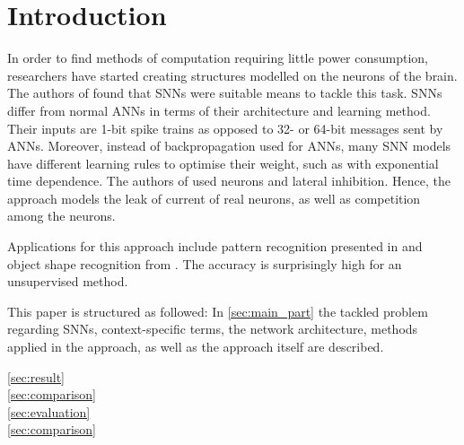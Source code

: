 \section{Introduction}

In order to find methods of computation requiring little power consumption, researchers have started creating structures modelled on the neurons of the brain.
The authors of \cite{SNN} found that \acp{SNN} were suitable means to tackle this task.
\acp{SNN} differ from normal \acp{ANN} in terms of their architecture and learning method.
Their inputs are 1-bit spike trains as opposed to 32- or 64-bit messages sent by \acp{ANN}.
Moreover, instead of backpropagation used for \acp{ANN}, many \ac{SNN} models have different learning rules to optimise their weight, such as  with exponential time dependence.
The authors of \cite{SNN} used  neurons and lateral inhibition.
Hence, the approach models the leak of current of real neurons, as well as competition among the neurons.

Applications for this approach include pattern recognition presented in \cite{SNN} and object shape recognition from \cite{object_detection_SNN}.
The accuracy is surprisingly high for an unsupervised method.

This paper is structured as followed:
In \autoref{sec:main_part} the tackled problem regarding \acp{SNN}, context-specific terms, the network architecture, methods applied in the approach, as well as the approach itself are described.

\textcolor{red}{\autoref{sec:result}\\
\autoref{sec:comparison}\\
\autoref{sec:evaluation}\\
\autoref{sec:comparison}}